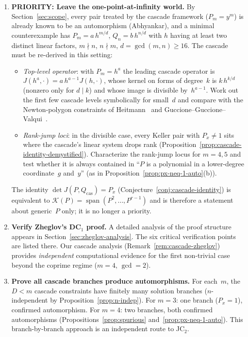 \documentclass[12pt,a4paper]{article}
\theoremstyle{definition}
\newcommand{\kk}{k}
\begin{document}
\begin{enumerate}
\item \textbf{PRIORITY: Leave the one-point-at-infinity world.}
  By Section~\ref{sec:scope}, every pair treated by the cascade
  framework ($P_m = y^m$) is already known to be an automorphism
  (Abhyankar), and a minimal counterexample has
  $P_m = a\,h^{m/d}$, $Q_n = b\,h^{n/d}$ with $h$ having at least
  two distinct linear factors, $m \nmid n$, $n \nmid m$,
  $d = \gcd(m,n) \geq 16$. The cascade must be
  re-derived in this setting:
  \begin{itemize}
  \item \emph{Top-level operator}: with $P_m = h^{a}$ the leading
    cascade operator is $J(h^a, \cdot) = a\,h^{a-1} J(h, \cdot)$,
    whose kernel on forms of degree~$k$ is $\kk\,h^{k/d}$
    (nonzero only for $d \mid k$) and whose image is divisible
    by~$h^{a-1}$. Work out the first few cascade levels symbolically
    for small~$d$ and compare with the Newton-polygon constraints of
    Heitmann~\cite{Heitmann1990} and
    Guccione--Guccione--Valqui~\cite{GGV,GGV2014}.
  \item \emph{Rank-jump loci}: in the divisible case, every Keller pair
    with $P_x \neq 1$ sits where the cascade's linear system drops rank
    (Proposition~\ref{prop:cascade-identity-demystified}). Characterize
    the rank-jump locus for $m = 4, 5$ and test whether it is always
    contained in ``$P$ is a polynomial in a lower-degree coordinate~$g$
    and~$y$'' (as in Proposition~\ref{prop:px-neq-1-auto}(b)).
  \end{itemize}
  The identity $\det J(P, Q_{\mathrm{cas}}) = P_x$
  (Conjecture~\ref{conj:cascade-identity}) is equivalent to
  $\mathcal{K}(P) = \operatorname{span}(P^2,\ldots,P^{r-1})$ and is
  therefore a statement about generic~$P$ only; it is no longer a
  priority.

\item \textbf{Verify Zheglov's DC$_1$ proof.}
  A detailed analysis of the proof structure appears in
  Section~\ref{sec:zheglov-analysis}.  The six critical verification
  points are listed there.
  Our cascade analysis (Remark~\ref{rem:cascade-zheglov}) provides
  \emph{independent} computational evidence for the first non-trivial
  case beyond the coprime regime ($m = 4$, $\gcd = 2$).

\item \textbf{Prove all cascade branches produce automorphisms.}
  For each~$m$, the $D < m$ cascade constraints have finitely many
  solution branches ($n$-independent by
  Proposition~\ref{prop:n-indep}). For $m = 3$: one branch ($P_x = 1$),
  confirmed automorphism. For $m = 4$: two branches, both confirmed
  automorphisms (Propositions~\ref{prop:spurious}
  and~\ref{prop:px-neq-1-auto}). This branch-by-branch approach
  is an independent route to JC$_2$.


\end{enumerate}
\end{document}
